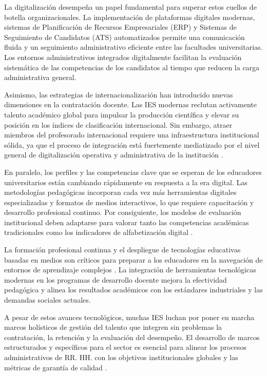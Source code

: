 \documentclass[conference]{IEEEtran}
\begin{document}
La digitalización desempeña un papel fundamental para superar estos cuellos de botella organizacionales. La implementación de plataformas digitales modernas, sistemas de Planificación de Recursos Empresariales (ERP) y Sistemas de Seguimiento de Candidatos (ATS) automatizados permite una comunicación fluida y un seguimiento administrativo eficiente entre las facultades universitarias. Los entornos administrativos integrados digitalmente facilitan la evaluación sistemática de las competencias de los candidatos al tiempo que reducen la carga administrativa general.

Asimismo, las estrategias de internacionalización han introducido nuevas dimensiones en la contratación docente. Las IES modernas reclutan activamente talento académico global para impulsar la producción científica y elevar su posición en los índices de clasificación internacional. Sin embargo, atraer miembros del profesorado internacional requiere una infraestructura institucional sólida, ya que el proceso de integración está fuertemente mediatizado por el nivel general de digitalización operativa y administrativa de la institución \cite{fan2025_8}.

En paralelo, los perfiles y las competencias clave que se esperan de los educadores universitarios están cambiando rápidamente en respuesta a la era digital. Las metodologías pedagógicas incorporan cada vez más herramientas digitales especializadas y formatos de medios interactivos, lo que requiere capacitación y desarrollo profesional continuo. Por consiguiente, los modelos de evaluación institucional deben adaptarse para valorar tanto las competencias académicas tradicionales como los indicadores de alfabetización digital \cite{ji2025_17}.

La formación profesional continua y el despliegue de tecnologías educativas basadas en medios son críticos para preparar a los educadores en la navegación de entornos de aprendizaje complejos \cite{gorbatkova2023_15}. La integración de herramientas tecnológicas modernas en los programas de desarrollo docente mejora la efectividad pedagógica y alinea los resultados académicos con los estándares industriales y las demandas sociales actuales.

A pesar de estos avances tecnológicos, muchas IES luchan por poner en marcha marcos holísticos de gestión del talento que integren sin problemas la contratación, la retención y la evaluación del desempeño. El desarrollo de marcos estructurados y específicos para el sector es esencial para alinear los procesos administrativos de RR. HH. con los objetivos institucionales globales y las métricas de garantía de calidad \cite{musakuro2022_71}.
\end{document}
